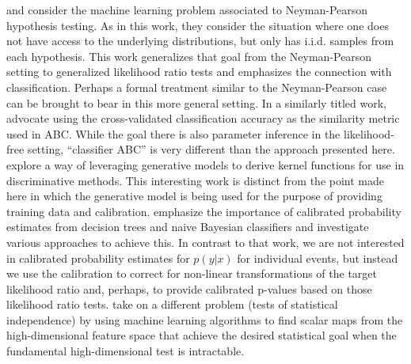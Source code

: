 \documentclass[12pt]{article}
\numberwithin{equation}{section}
\theoremstyle{plain}
\begin{document}
\cite{ClaytonScott} and \cite{JMLR:v14:tong13a} consider the machine learning
problem associated to Neyman-Pearson hypothesis testing. As in this work, they
consider the situation where one does not have access to the underlying
distributions, but only has i.i.d. samples from each hypothesis. This work
generalizes that goal from the Neyman-Pearson setting to generalized likelihood
ratio tests and emphasizes the connection with classification. Perhaps a  formal
treatment similar to the Neyman-Pearson case can be brought to bear in this more
general setting. In a similarly titled work, \cite{Gutmann2014} advocate using
the cross-validated classification accuracy as the similarity metric used in
ABC. While the goal there is also parameter inference in the likelihood-free
setting,  ``classifier ABC'' is very different than the approach presented here.
\cite{TommiJaakkola} explore a way of leveraging generative models to derive
kernel functions for use in discriminative methods. This interesting work is
distinct from the point made here in which the generative model is being used
for the purpose of providing training data and calibration.
\cite{BiancaZadrozny} emphasize the importance of calibrated probability
estimates from decision trees and naive Bayesian classifiers and investigate
various approaches to achieve this. In contrast to that work, we are not
interested in calibrated probability estimates for $p(y|x)$ for individual
events, but instead we use the calibration to correct for non-linear
transformations of the target likelihood ratio and, perhaps, to provide
calibrated p-values based on those likelihood ratio tests. \cite{Ihler2004} take
on a different problem (tests of statistical independence) by using machine
learning algorithms to find  scalar maps from the high-dimensional feature space
that achieve the desired statistical goal when the fundamental high-dimensional
test is intractable.
\end{document}

